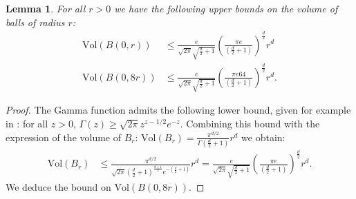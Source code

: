 \documentclass[11pt]{article}
\newtheorem{lemma}{Lemma}[section]
\newcommand{\1}{\mathbbm{1}}
\numberwithin{equation}{section}
\begin{document}
\begin{lemma}
    For all  $r>0$ we have the following upper bounds on the volume of balls of radius $r$:
    \begin{align*}
        \mathrm{Vol}(B(0,r)) &\leq \frac{e}{\sqrt{2\pi}\sqrt{\frac{d}{2}+1} }
        \left(\frac{\pi e}{\left( \frac{d}{2} + 1 \right)} \right)^{\frac{d}{2}} r^d \\
        \mathrm{Vol}(B(0,8r)) &\leq
       \frac{e}{\sqrt{2\pi}\sqrt{\frac{d}{2}+1} }
        \left(\frac{\pi e 64}{\left( \frac{d}{2} + 1 \right)} \right)^{\frac{d}{2}} r^d.
    \end{align*}
    \label{Lem:volume_estimate_ball}
\end{lemma}
\begin{proof}
    The Gamma function admits the following lower bound, given for example in \cite[Section 5.6]{olver2010nist}: for all $z>0$, $\Gamma(z) \geq \sqrt{2\pi}z^{z - 1/2}e^{-z}$. Combining this bound with the expression of the volume of $B_{r}$: $\mathrm{Vol}(B_r) = \frac{\pi^{d/2}}{\Gamma\left( \frac{d}{2} + 1 \right)} r^d$ we obtain: 
    \begin{align*}
        \mathrm{Vol}(B_r) &\leq
    	\frac{\pi^{d/2}}{\sqrt{2\pi}\left( \frac{d}{2} + 1 \right)^{\frac{d+1}{2}}e^{-\left( \frac{d}{2} + 1 \right)} } r^d = 
    	\frac{e}{\sqrt{2\pi}\sqrt{\frac{d}{2}+1} }
    	\left(\frac{\pi e}{\left( \frac{d}{2} + 1 \right)} \right)^{\frac{d}{2}} r^d.
    \end{align*}
    We deduce the bound on $\mathrm{Vol}(B(0,8r))$.
\end{proof}
\end{document}
